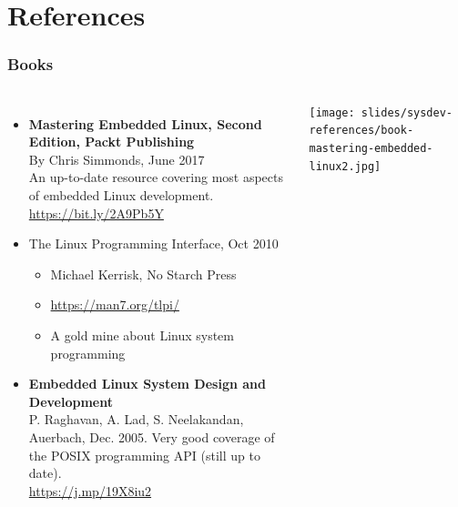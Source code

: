 \section{References}

\begin{frame}
  \frametitle{Books}
  \begin{columns}
    \small
    \begin{itemize}
    \item {\bf Mastering Embedded Linux, Second Edition, Packt
      Publishing}\\
      By Chris Simmonds, June 2017\\
      An up-to-date resource covering most aspects of embedded Linux
      development.\\
      \url{https://bit.ly/2A9Pb5Y}
    \item The Linux Programming Interface, Oct 2010
      \begin{itemize}
      \item Michael Kerrisk, No Starch Press
      \item \url{https://man7.org/tlpi/}
      \item A gold mine about Linux system programming
      \end{itemize}
    \item {\bf Embedded Linux System Design and Development}\\
      P. Raghavan, A. Lad, S. Neelakandan, Auerbach, Dec. 2005.
      Very good coverage of the POSIX programming API (still up
      to date).\\
      \url{https://j.mp/19X8iu2}
    \end{itemize}
    \normalsize
    \texttt{[image: slides/sysdev-references/book-mastering-embedded-linux2.jpg]}\\
    \vspace{0.5cm}

\end{columns}
\end{frame}
